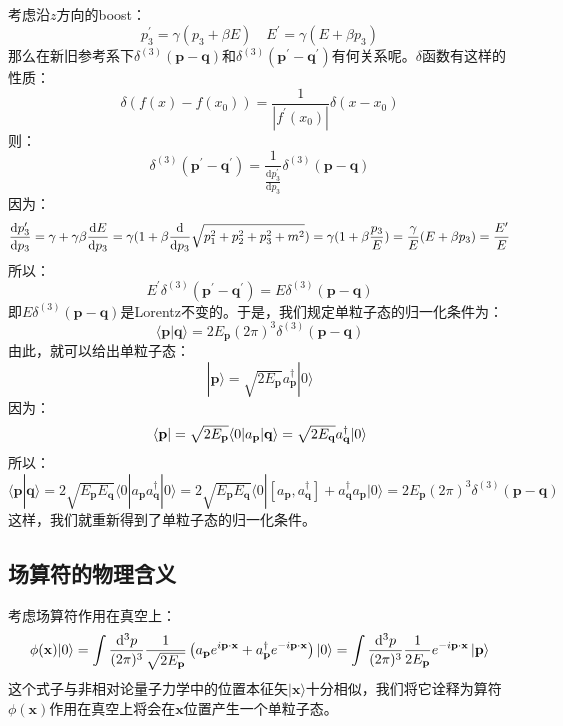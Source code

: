 \documentclass{book}
\begin{document}
考虑沿$z$方向的boost：
$$
p_3^\prime=\gamma(p_3+\beta E) \quad E^\prime=\gamma(E+\beta p_3)
$$
那么在新旧参考系下$\delta^{(3)}(\mathbf{p}-\mathbf{q})$和$\delta^{(3)}(\mathbf{p}^\prime-\mathbf{q}^\prime)$有何关系呢。$\delta$函数有这样的性质：
$$
\delta(f(x)-f(x_0))=\frac1{|f^{\prime}(x_0)|}\delta(x-x_0)
$$
则：
$$
\delta^{(3)}(\mathbf{p}^{\prime}-\mathbf{q}^{\prime})=\frac{1}{\frac{\mathrm{d}p_{3}^{\prime}}{\mathrm{d}p_{3}}}\delta^{(3)}(\mathbf{p}-\mathbf{q})
$$
因为：
$$
\frac{\mathrm{d}p_{3}^{\prime}}{\mathrm{d}p_{3}}=\gamma+\gamma\beta\frac{\mathrm{d}E}{\mathrm{d}p_3}=\gamma(1+\beta\frac{\mathrm{d}}{\mathrm{d}p_3}\sqrt{p_1^2+p_2^2+p_3^2+m^2})\\=\gamma(1+\beta\frac{p_3}E)=\frac{\gamma}{E}(E+\beta p_3)=\frac{E^\prime}{E}
$$
所以：
$$
E^\prime\delta^{(3)}(\mathbf{p}^{\prime}-\mathbf{q}^{\prime})=E\delta^{(3)}(\mathbf{p}-\mathbf{q})
$$
即$E\delta^{(3)}(\mathbf{p}-\mathbf{q})$是Lorentz不变的。于是，我们规定单粒子态的归一化条件为：
$$
\langle\mathbf{p}|\mathbf{q}\rangle=2E_\mathbf{p}(2\pi)^3\delta^{(3)}(\mathbf{p}-\mathbf{q})
$$
由此，就可以给出单粒子态：
$$
|\mathbf{p}\rangle=\sqrt{2E_\mathbf{p}}a_\mathbf{p}^\dagger|0\rangle
$$
因为：
$$
\langle\mathbf{p}|=\sqrt{2E_\mathbf{p}}\langle 0|a_\mathbf{p}
\\|\mathbf{q}\rangle=\sqrt{2E_\mathbf{q}}a_\mathbf{q}^\dagger|0\rangle
$$
所以：
$$
\langle\mathbf{p}|\mathbf{q}\rangle=2\sqrt{E_\mathbf{p}E_\mathbf{q}}\langle0|a_\mathbf{p}a_\mathbf{q}^\dagger|0\rangle=2\sqrt{E_\mathbf{p}E_\mathbf{q}}\langle0|[a_\mathbf{p},a_\mathbf{q}^\dagger]+a_\mathbf{q}^\dagger a_\mathbf{p}|0\rangle=2E_\mathbf{p}(2\pi)^3\delta^{(3)}(\mathbf{p}-\mathbf{q})
$$
这样，我们就重新得到了单粒子态的归一化条件。
\subsection{场算符的物理含义}
考虑场算符作用在真空上：
$$
\phi(\mathbf{x})|0\rangle=\int\frac{\mathrm{d}^{3}p}{(2\pi)^{3}}\frac1{\sqrt{2E_{\mathbf{p}}}}\left(a_{\mathbf{p}}{e}^{{i}\mathbf{p}\cdot\mathbf{x}}+a_{\mathbf{p}}^{\dagger}{e}^{-{i}\mathbf{p}\cdot\mathbf{x}}\right)|0\rangle\\
=\int\frac{\mathrm{d}^3p}{(2\pi)^3}\frac1{2E_\mathbf{p}}e^{-i\mathbf{p}\cdot\mathbf{x}}\left|\mathbf{p}\right\rangle
$$
这个式子与非相对论量子力学中的位置本征矢$|\mathbf{x}\rangle$十分相似，我们将它诠释为算符$\phi(\mathbf{x})$作用在真空上将会在$\mathbf{x}$位置产生一个单粒子态。
\end{document}
